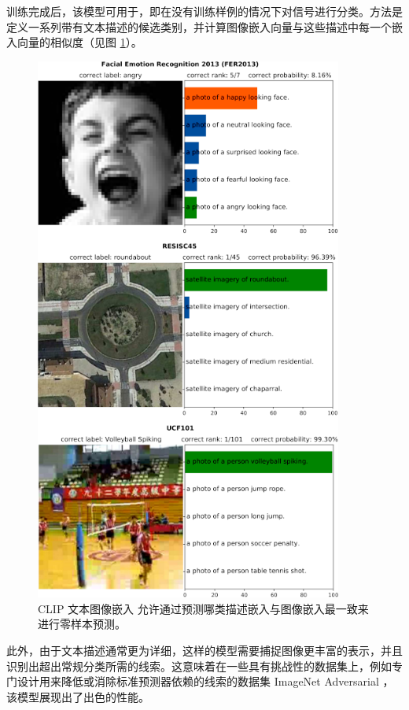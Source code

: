 训练完成后，该模型可用于，即在没有训练样例的情况下对信号进行分类。方法是定义一系列带有文本描述的候选类别，并计算图像嵌入向量与这些描述中每一个嵌入向量的相似度（见图 \ref{fig6.4}）。

\begin{figure}
    \centering
    \includegraphics[width=0.9\textwidth]{fig/fig6.4.png}
    \caption[CLIP 零样本预测]{CLIP 文本图像嵌入 \citep{arxiv-2103.00020} 允许通过预测哪类描述嵌入与图像嵌入最一致来进行零样本预测。}
    \label{fig6.4}
\end{figure}

此外，由于文本描述通常更为详细，这样的模型需要捕捉图像更丰富的表示，并且识别出超出常规分类所需的线索。这意味着在一些具有挑战性的数据集上，例如专门设计用来降低或消除标准预测器依赖的线索的数据集 ImageNet Adversarial \citep{arxiv-1907.07174}，该模型展现出了出色的性能。

